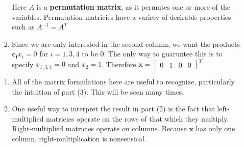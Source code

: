 \documentclass[11pt]{article}
\begin{document}
\begin{itemize}
\begin{examplebox}[1.1]
\begin{solution}[1.1]
\begin{enumerate}
Here $A$ is a \textbf{permutation matrix}, as it permutes one or more of the variables. Permutation matricies have a variety of desirable properties such as $A^{-1}= A^{T}$
\item Since we are only interested in the second column, we want the products $\mathbf{c_{i}}x_{i}=0$ for $i=1,3,4$ to be 0. The only way to guaruntee this is to specify $x_{1,3,4}=0$ and $x_{2}=1$. Therefore $\mathbf{x}=\begin{bmatrix}
  0 & 1 & 0 & 0
\end{bmatrix}^{T}$
		\end{enumerate}
	\end{solution}
	\begin{takeaways}[1.1]\quad\vspace{-0.5cm}
	    \begin{enumerate}
			\item All of the matrix formulations here are useful to recognize, particularly the intuition of part (3). This will be seen many times.
			\item One useful way to interpret the result in part (2) is the fact that left-multiplied matricies operate on the rows of that which they multiply. Right-multiplied matricies operate on columns. Because $\mathbf{x}$ has only one column, right-multiplication is nonsensical. 


\end{enumerate}
\end{takeaways}
\end{examplebox}
\end{itemize}
\end{document}
